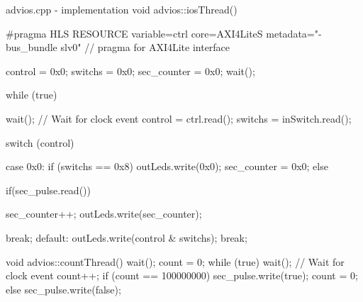 \documentclass[../main.tex]{subfiles}
\begin{document}
\begin{myminted}{advios.cpp - implementation}
    void advios::iosThread() {
    #pragma HLS RESOURCE variable=ctrl core=AXI4LiteS metadata="-bus_bundle slv0" // pragma for AXI4Lite interface
    
        control = 0x0;
        switchs = 0x0;
        sec_counter = 0x0;
        wait();
    
        while (true) {
            wait(); // Wait for clock event
            control = ctrl.read();
            switchs = inSwitch.read();
    
            switch (control){
                case 0x0:
                    if (switchs == 0x8) {
                        outLeds.write(0x0);
                        sec_counter = 0x0;
                    }else{
                        if(sec_pulse.read()){
        
                            sec_counter++;
                            outLeds.write(sec_counter);
                        }
                    }
                    break;
                default:
                    outLeds.write(control & switchs);
                    break;
            }
        }
    }
    void advios::countThread() {
        wait();
        count = 0;
        while (true) {
            wait();  // Wait for clock event
            count++;
            if (count == 100000000) {
                sec_pulse.write(true);
                count = 0;
            } else {
                sec_pulse.write(false);
            }
        }
    }
\end{myminted}
\end{document}
